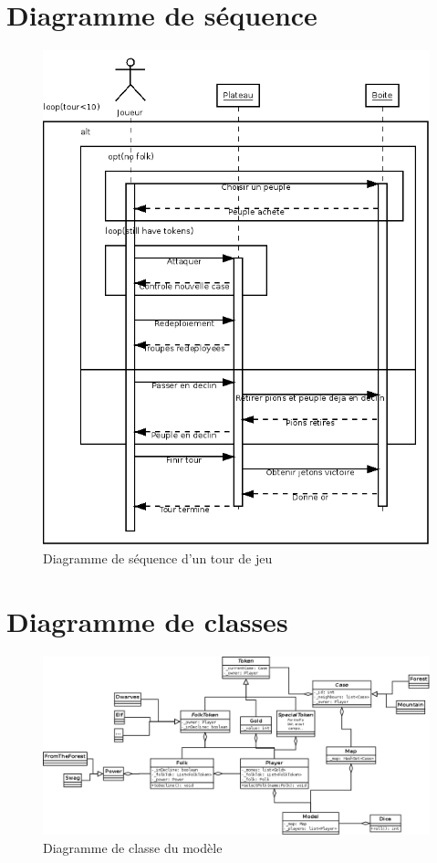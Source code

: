 \documentclass[a4paper]{report}
\begin{document}
\section{Diagramme de séquence}
\begin{figure}
    \begin{center}
        \includegraphics[width=\textwidth]{sequence.png}
        \caption{Diagramme de séquence d'un tour de jeu}
    \end{center}
\end{figure}
\section{Diagramme de classes}
\begin{figure}
    \begin{center}
        \includegraphics[width=\textheight,angle=90]{classe.png}
        \caption{Diagramme de classe du modèle}
    \end{center}
\end{figure}
\end{document}

